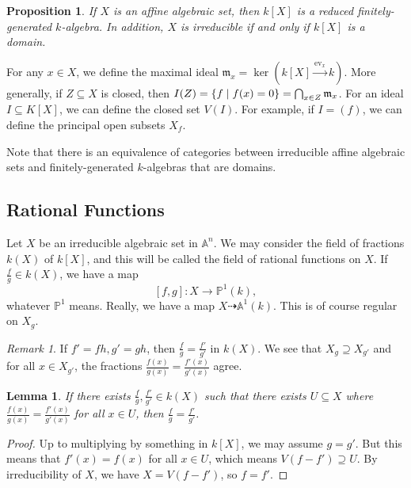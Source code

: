 \documentclass[leqno, openany]{memoir}
\newtheorem{prop}[thm]{Proposition}
\newtheorem{lem}[thm]{Lemma}
\theoremstyle{definition}
\theoremstyle{remark}
\newtheorem{rmk}[thm]{Remark}
\theoremstyle{plain}
\theoremstyle{definition}
\theoremstyle{remark}
\newcommand{\A}{\mathbb{A}}
\renewcommand{\P}{\mathbb{P}}
\newcommand{\mf}[1]{\mathfrak{#1}}
\newcommand{\mr}[1]{\mathrm{#1}}
\begin{document}
\begin{prop}
    If $X$ is an affine algebraic set, then $k[X]$ is a reduced finitely-generated $k$-algebra. In addition, $X$ is irreducible if and only if $k[X]$ is a domain.
\end{prop}

For any $x \in X$, we define the maximal ideal $\mf{m}_x = \ker (k[X] \xrightarrow{\mr{ev}_x} k)$. More generally, if $Z \subseteq X$ is closed, then $I(Z) = \qty{f \mid f(x) = 0} = \bigcap_{x \in Z} \mf{m}_x$. For an ideal $I \subseteq K[X]$, we can define the closed set $V(I)$. For example, if $I = (f)$, we can define the principal open subsets $X_f$.

Note that there is an equivalence of categories between irreducible affine algebraic sets and finitely-generated $k$-algebras that are domains.

\subsection{Rational Functions}%
\label{sub:rational_functions}

Let $X$ be an irreducible algebraic set in $\A^n$. We may consider the field of fractions $k(X)$ of $k[X]$, and this will be called the field of rational functions on $X$. If $\frac{f}{g} \in k(X)$, we have a map
\[ [f,g] \colon X \to \P^1(k), \]
whatever $\P^1$ means. Really, we have a map $X \dashrightarrow \A^1(k)$. This is of course regular on $X_g$.

\begin{rmk}
    If $f' = fh, g' = gh$, then $\frac{f}{g} = \frac{f'}{g'}$ in $k(X)$. We see that $X_g \supseteq X_{g'}$ and for all $x \in X_{g'}$, the fractions $\frac{f(x)}{g(x)} = \frac{f'(x)}{g'(x)}$ agree.
\end{rmk}

\begin{lem}
    If there exists $\frac{f}{g}, \frac{f'}{g'} \in k(X)$ such that there exists $U \subseteq X$ where $\frac{f(x)}{g(x)} = \frac{f'(x)}{g'(x)}$ for all $x \in U$, then $\frac{f}{g} = \frac{f'}{g'}$.
\end{lem}

\begin{proof}
    Up to multiplying by something in $k[X]$, we may assume $g = g'$. But this means that $f'(x) = f(x)$ for all $x \in U$, which means $V(f-f') \supseteq U$. By irreducibility of $X$, we have $X = V(f-f')$, so $f = f'$.
\end{proof}
\end{document}
